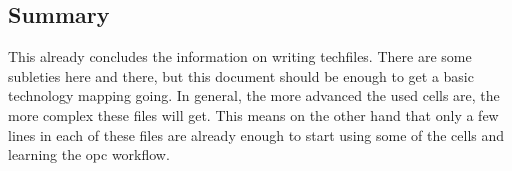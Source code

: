 \subsection{Summary}
This already concludes the information on writing techfiles.
There are some subleties here and there, but this document should be enough to get a basic technology mapping going.
In general, the more advanced the used cells are, the more complex these files will get.
This means on the other hand that only a few lines in each of these files are already enough to start using some of the cells and learning the opc workflow.



